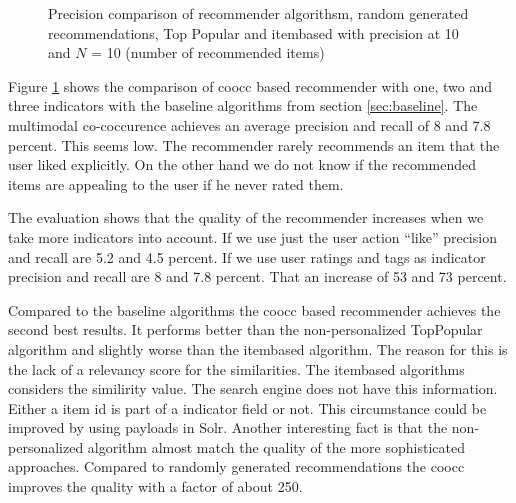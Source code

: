 \pgfplotsset{width=7cm}
\begin{figure}
  \centering
{} 
\caption{Precision comparison of recommender algorithsm, random generated recommendations, Top Popular and itembased with precision at 10 and $N$ = 10 (number of recommended items)}
  \label{fig:precisionrecallvalues}
\end{figure}

Figure \ref{fig:precisionrecallvalues} shows the comparison of \gls{coocc} based recommender with one, two and three indicators with the baseline algorithms from section \ref{sec:baseline}.
The multimodal co-coccurence  achieves an average precision and recall of 8 and 7.8 percent. This seems low. The recommender rarely recommends an item that the user liked explicitly. On the other hand we do not know if the recommended items are appealing to the user if he never rated them.

The evaluation shows that the quality of the recommender increases when we take more indicators into account. If we use just the user action ``like'' precision and recall are 5.2 and 4.5 percent. If we use user ratings and tags as indicator precision and recall are  8 and 7.8 percent. That an increase of 53 and 73 percent.

Compared to the baseline algorithms the \gls{coocc} based recommender achieves the second best results. It performs better than the non-personalized TopPopular algorithm and slightly worse than the itembased algorithm. The reason for this is the lack of a relevancy score for the similarities. The itembased algorithms considers the similirity value. The search engine does not have this information. Either a item id is part of a indicator field or not. This circumstance could be improved by using payloads in Solr. Another interesting fact is that the non-personalized algorithm almost match the quality of the more sophisticated approaches. Compared to randomly generated recommendations the \gls{coocc} improves the quality with a factor of about 250.
